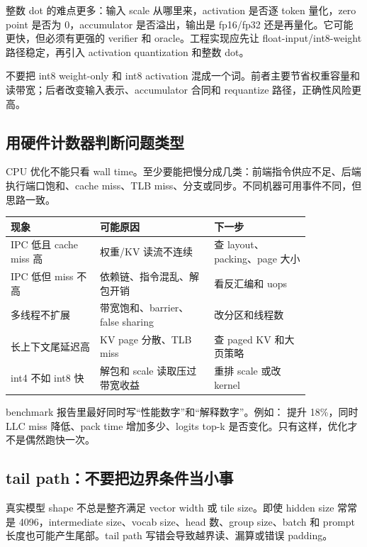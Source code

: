 整数 dot 的难点更多：输入 scale 从哪里来，activation 是否逐 token 量化，zero point 是否为 0，accumulator 是否溢出，输出是 fp16/fp32 还是再量化。它可能更快，但必须有更强的 verifier 和 oracle。工程实现应先让 float-input/int8-weight 路径稳定，再引入 activation quantization 和整数 dot。

\begin{warningbox}
不要把 int8 weight-only 和 int8 activation 混成一个词。前者主要节省权重容量和读带宽；后者改变输入表示、accumulator 合同和 requantize 路径，正确性风险更高。
\end{warningbox}

\subsection{用硬件计数器判断问题类型}

CPU 优化不能只看 wall time。至少要能把慢分成几类：前端指令供应不足、后端执行端口饱和、cache miss、TLB miss、分支或同步。不同机器可用事件不同，但思路一致。

\begin{center}
\begin{tabular}{p{0.25\linewidth}p{0.32\linewidth}p{0.27\linewidth}}
\toprule
现象 & 可能原因 & 下一步 \\
\midrule
IPC 低且 cache miss 高 & 权重/KV 读流不连续 & 查 layout、packing、page 大小 \\
IPC 低但 miss 不高 & 依赖链、指令混乱、解包开销 & 看反汇编和 uops \\
多线程不扩展 & 带宽饱和、barrier、false sharing & 改分区和线程数 \\
长上下文尾延迟高 & KV page 分散、TLB miss & 查 paged KV 和大页策略 \\
int4 不如 int8 快 & 解包和 scale 读取压过带宽收益 & 重排 scale 或改 kernel \\
\bottomrule
\end{tabular}
\end{center}

benchmark 报告里最好同时写“性能数字”和“解释数字”。例如： 提升 18\%，同时 LLC miss 降低、pack time 增加多少、logits top-k 是否变化。只有这样，优化才不是偶然跑快一次。

\subsection{tail path：不要把边界条件当小事}

真实模型 shape 不总是整齐满足 vector width 或 tile size。即使 hidden size 常常是 4096，intermediate size、vocab size、head 数、group size、batch 和 prompt 长度也可能产生尾部。tail path 写错会导致越界读、漏算或错误 padding。

